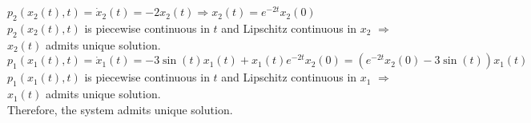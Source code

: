 \documentclass[a4paper,10.5pt]{article}
\begin{document}
$p_2(x_2(t),t)=\dot{x}_2(t)=-2x_2(t) \Rightarrow x_2(t) = e^{-2t}x_2(0)$\\
$p_2(x_2(t),t)$ is piecewise continuous in $t$ and Lipschitz continuous in $x_2$ $\Rightarrow$ $x_2(t)$ admits unique solution. \\
$p_1(x_1(t),t)=\dot{x}_1(t)=-3\sin(t)x_1(t)+x_1(t)e^{-2t}x_2(0)=\left(e^{-2t}x_2(0)-3\sin(t)\right)x_1(t)$ \\
$p_1(x_1(t),t)$ is piecewise continuous in $t$ and Lipschitz continuous in $x_1$ $\Rightarrow$ $x_1(t)$ admits unique solution. \\

Therefore, the system admits unique solution.
\end{document}
